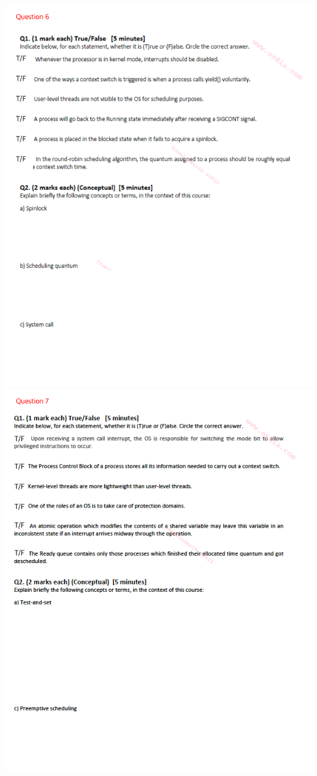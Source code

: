\documentclass[12pt]{article}
\begin{document}
\begin{center}
    \includegraphics[width=\linewidth]{../images/midterm_5_6.png}
    \includegraphics[width=\linewidth]{../images/midterm_5_7.png}

\end{center}
\end{document}
